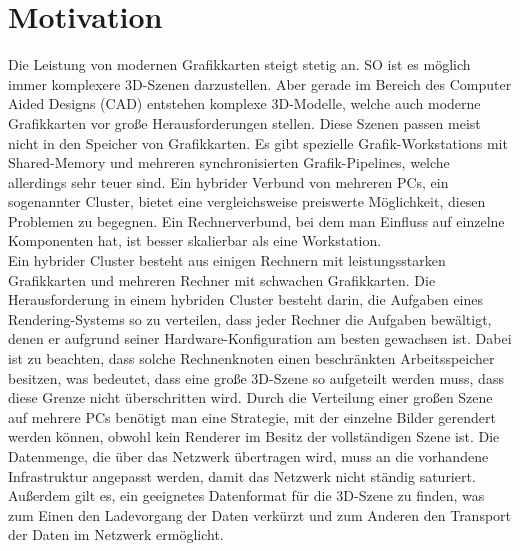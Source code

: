 \section{Motivation}
\label{sec:intro:motivation}
Die Leistung von modernen Grafikkarten steigt stetig an. SO ist es möglich immer komplexere 3D-Szenen darzustellen. Aber gerade im Bereich des Computer Aided Designs (CAD) entstehen komplexe 3D-Modelle, welche auch moderne Grafikkarten vor große Herausforderungen stellen. Diese Szenen passen meist nicht in den Speicher von Grafikkarten. Es gibt spezielle Grafik-Workstations mit Shared-Memory und mehreren synchronisierten Grafik-Pipelines, welche allerdings sehr teuer sind. Ein hybrider Verbund von mehreren PCs, ein sogenannter Cluster, bietet eine vergleichsweise preiswerte Möglichkeit, diesen Problemen zu begegnen. Ein Rechnerverbund, bei dem man Einfluss auf einzelne Komponenten hat, ist besser skalierbar als eine Workstation.\\
Ein hybrider Cluster besteht aus einigen Rechnern mit leistungsstarken Grafikkarten und mehreren Rechner mit schwachen Grafikkarten. Die Herausforderung in einem hybriden Cluster besteht darin, die Aufgaben eines Rendering-Systems so zu verteilen, dass jeder Rechner die Aufgaben bewältigt, denen er aufgrund seiner Hardware-Konfiguration am besten gewachsen ist. Dabei ist zu beachten, dass solche Rechnenknoten einen beschränkten Arbeitsspeicher besitzen, was bedeutet, dass eine große 3D-Szene so aufgeteilt werden muss, dass diese Grenze nicht überschritten wird. Durch die Verteilung einer großen Szene auf mehrere PCs benötigt man eine Strategie, mit der einzelne Bilder gerendert werden können, obwohl kein Renderer im Besitz der vollständigen Szene ist. Die Datenmenge, die über das Netzwerk übertragen wird, muss an die vorhandene Infrastruktur angepasst werden, damit das Netzwerk nicht ständig saturiert. Außerdem gilt es, ein geeignetes Datenformat für die 3D-Szene zu finden, was zum Einen den Ladevorgang der Daten verkürzt und zum Anderen den Transport der Daten im Netzwerk ermöglicht.

%
%
